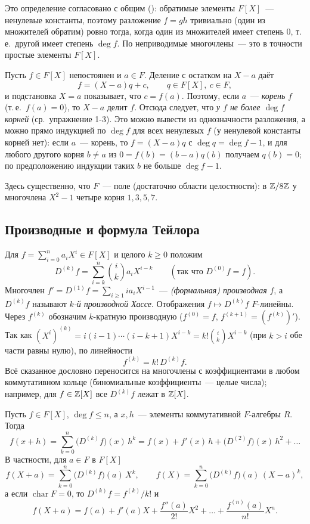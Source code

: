 \begin{remark}[1.6a]
Это определение согласовано с общим (): обратимые элементы $F[X]$~--- ненулевые константы, поэтому разложение
$f=gh$ тривиально (один из множителей обратим) ровно тогда, когда один из множителей имеет степень $0$, т.\,е.\ другой
имеет степень $\deg f$. По  неприводимые многочлены~--- это в точности простые элементы $F[X]$.
\end{remark}

\begin{remark}[1.7]
Пусть $f\in F[X]$ непостоянен и $a\in F$. Деление с остатком на $X-a$ даёт
\[
f=(X-a)q+c,\qquad q\in F[X],\ c\in F,
\]
и подстановка $X=a$ показывает, что $c=f(a)$. Поэтому, если $a$~--- \emph{корень} $f$ (т.\,е.\ $f(a)=0$), то $X-a$ делит $f$.
Отсюда следует, что \emph{у $f$ не более $\deg f$ корней} (ср.\ упражнение 1-3). Это можно вывести из однозначности
разложения, а можно прямо индукцией по $\deg f$ для всех ненулевых $f$ (у ненулевой константы корней нет): если
$a$~--- корень, то $f=(X-a)q$ с $\deg q=\deg f-1$, и для любого
другого корня $b\ne a$ из $0=f(b)=(b-a)q(b)$ получаем $q(b)=0$; по предположению индукции таких $b$ не больше
$\deg f-1$.

Здесь существенно, что $F$~--- поле (достаточно области целостности): в $\mathbb Z/8\mathbb Z$ у многочлена $X^2-1$ четыре корня
$1,3,5,7$.
\end{remark}

\subsection*{Производные и формула Тейлора}

Для $f=\sum_{i=0}^na_iX^i\in F[X]$ и целого $k\ge0$ положим
\[
D^{(k)}f=\sum_{i=k}^n\binom ika_iX^{i-k}\qquad(\text{так что }D^{(0)}f=f).
\]
Многочлен $f'=D^{(1)}f=\sum_{i\ge1}ia_iX^{i-1}$~--- \emph{(формальная) производная} $f$, а $D^{(k)}f$ называют
\emph{$k$-й производной Хассе}. Отображения $f\mapsto D^{(k)}f$ $F$-линейны. Через $f^{(k)}$ обозначим $k$-кратную
производную ($f^{(0)}=f$, $f^{(k+1)}=(f^{(k)})'$). Так как $(X^i)^{(k)}=i(i-1)\cdots(i-k+1)X^{i-k}=k!\binom ikX^{i-k}$
(при $k>i$ обе части равны нулю), по линейности
\[
f^{(k)}=k!\,D^{(k)}f .
\]
Всё сказанное дословно переносится на многочлены с коэффициентами в любом коммутативном кольце (биномиальные
коэффициенты~--- целые числа); например, для $f\in\mathbb Z[X]$ все $D^{(k)}f$ лежат в $\mathbb Z[X]$.

\begin{proposition}
Пусть $f\in F[X]$, $\deg f\le n$, а $x,h$~--- элементы коммутативной $F$-алгебры $R$. Тогда
\[
f(x+h)=\sum_{k=0}^n\bigl(D^{(k)}f\bigr)(x)\,h^k=f(x)+f'(x)\,h+\bigl(D^{(2)}f\bigr)(x)\,h^2+\dots
\]
В частности, для $a\in F$ в $F[X]$
\[
f(X+a)=\sum_{k=0}^n\bigl(D^{(k)}f\bigr)(a)\,X^k,\qquad f(X)=\sum_{k=0}^n\bigl(D^{(k)}f\bigr)(a)\,(X-a)^k,
\]
а если $\operatorname{char}F=0$, то $D^{(k)}f=f^{(k)}/k!$ и
\[
f(X+a)=f(a)+f'(a)X+\frac{f''(a)}{2!}X^2+\dots+\frac{f^{(n)}(a)}{n!}X^n .
\]
\end{proposition}


